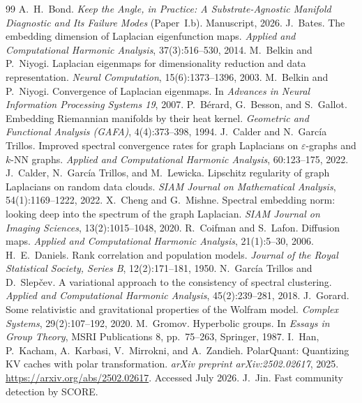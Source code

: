 \documentclass[review]{siamart220329}
\begin{document}
\begin{thebibliography}{99}
 A.~H.~Bond. \emph{Keep the Angle, in Practice: A
Substrate-Agnostic Manifold Diagnostic and Its Failure Modes} (Paper~I.b).
Manuscript, 2026.
 J.~Bates. The embedding dimension of Laplacian
eigenfunction maps. \emph{Applied and Computational Harmonic Analysis},
37(3):516--530, 2014.
 M.~Belkin and P.~Niyogi. Laplacian eigenmaps for
dimensionality reduction and data representation. \emph{Neural Computation},
15(6):1373--1396, 2003.
 M.~Belkin and P.~Niyogi. Convergence of Laplacian
eigenmaps. In \emph{Advances in Neural Information Processing Systems 19}, 2007.
 P.~B\'erard, G.~Besson, and S.~Gallot. Embedding
Riemannian manifolds by their heat kernel. \emph{Geometric and Functional
Analysis (GAFA)}, 4(4):373--398, 1994.
 J.~Calder and N.~Garc\'ia Trillos. Improved spectral
convergence rates for graph Laplacians on $\varepsilon$-graphs and $k$-NN graphs.
\emph{Applied and Computational Harmonic Analysis}, 60:123--175, 2022.
 J.~Calder, N.~Garc\'ia Trillos, and
M.~Lewicka. Lipschitz regularity of graph Laplacians on random data clouds.
\emph{SIAM Journal on Mathematical Analysis}, 54(1):1169--1222, 2022.
 X.~Cheng and G.~Mishne. Spectral embedding norm:
looking deep into the spectrum of the graph Laplacian. \emph{SIAM Journal on
Imaging Sciences}, 13(2):1015--1048, 2020.
 R.~Coifman and S.~Lafon. Diffusion maps. \emph{Applied and
Computational Harmonic Analysis}, 21(1):5--30, 2006.
 H.~E.~Daniels. Rank correlation and population
models. \emph{Journal of the Royal Statistical Society, Series B},
12(2):171--181, 1950.
 N.~Garc\'ia Trillos and D.~Slep\v{c}ev. A
variational approach to the consistency of spectral clustering. \emph{Applied
and Computational Harmonic Analysis}, 45(2):239--281, 2018.
 J.~Gorard. Some relativistic and gravitational properties of
the Wolfram model. \emph{Complex Systems}, 29(2):107--192, 2020.
 M.~Gromov. Hyperbolic groups. In \emph{Essays in Group
Theory}, MSRI Publications 8, pp.~75--263, Springer, 1987.
 I.~Han, P.~Kacham, A.~Karbasi, V.~Mirrokni, and
A.~Zandieh. PolarQuant: Quantizing KV caches with polar transformation.
\emph{arXiv preprint arXiv:2502.02617}, 2025.
\url{https://arxiv.org/abs/2502.02617}. Accessed July 2026.
 J.~Jin. Fast community detection by SCORE.

\end{thebibliography}
\end{document}
